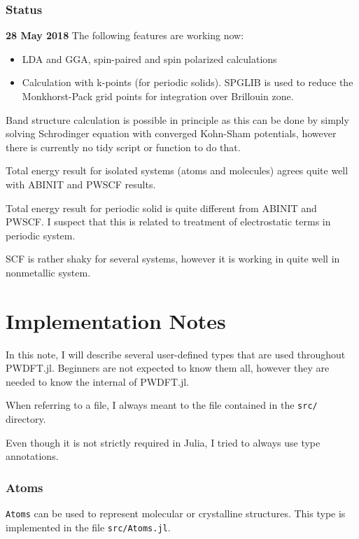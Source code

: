 \documentclass[a4paper,10pt]{paper}
\begin{document}
\section{Status}

\textbf{28 May 2018} The following features are working now:
\begin{itemize}
\item LDA and GGA, spin-paired and spin polarized calculations
\item Calculation with k-points (for periodic solids).
  \textsf{SPGLIB} is used to reduce the Monkhorst-Pack grid points
  for integration over Brillouin zone.
\end{itemize}

Band structure calculation is possible in principle as this can be
done by simply solving
Schrodinger equation with converged Kohn-Sham potentials, however there
is currently no tidy script or function to do that.

Total energy result for isolated systems (atoms and molecules) agrees quite
well with ABINIT and PWSCF results.

Total energy result for periodic solid is quite different from ABINIT and PWSCF.
I suspect that this is related to treatment of electrostatic terms in periodic system.

SCF is rather shaky for several systems, however it is working in quite well in nonmetallic
system.

\part{Implementation Notes}

In this note, I will describe several user-defined types that are
used throughout \textsf{PWDFT.jl}. Beginners are not expected to know them
all, however they are needed to know the internal of \textsf{PWDFT.jl}.

When referring to a file, I always meant to the file contained in
the \texttt{src/} directory.

Even though it is not strictly required in Julia, I tried to always use type annotations.

\section{Atoms}

\texttt{Atoms} can be used to represent molecular or crystalline structures.
This type is implemented in the file \texttt{src/Atoms.jl}.
\end{document}
